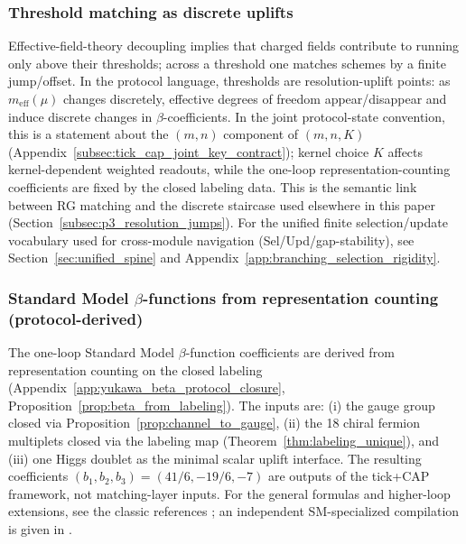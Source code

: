 \subsubsection{Threshold matching as discrete uplifts}
\label{subsec:threshold_matching}

\InterfaceTag Effective-field-theory decoupling implies that charged fields contribute to running only above their thresholds; across a threshold one matches schemes by a finite jump/offset.
In the protocol language, thresholds are resolution-uplift points: as $m_{\mathrm{eff}}(\mu)$ changes discretely, effective degrees of freedom appear/disappear and induce discrete changes in $\beta$-coefficients.
In the joint protocol-state convention, this is a statement about the $(m,n)$ component of $(m,n,K)$ (Appendix~\ref{subsec:tick_cap_joint_key_contract}); kernel choice $K$ affects kernel-dependent weighted readouts, while the one-loop representation-counting coefficients are fixed by the closed labeling data.
This is the semantic link between RG matching and the discrete staircase used elsewhere in this paper (Section~\ref{subsec:p3_resolution_jumps}).
\AuditTag For the unified finite selection/update vocabulary used for cross-module navigation (Sel/Upd/gap-stability), see Section~\ref{sec:unified_spine} and Appendix~\ref{app:branching_selection_rigidity}.

\subsubsection{Standard Model $\beta$-functions from representation counting (protocol-derived)}
\label{subsec:sm_beta_functions_dictionary}

\InterfaceTag The one-loop Standard Model $\beta$-function coefficients are derived from representation counting on the closed labeling (Appendix~\ref{app:yukawa_beta_protocol_closure}, Proposition~\ref{prop:beta_from_labeling}).
The inputs are: (i) the gauge group closed via Proposition~\ref{prop:channel_to_gauge}, (ii) the 18 chiral fermion multiplets closed via the labeling map (Theorem~\ref{thm:labeling_unique}), and (iii) one Higgs doublet as the minimal scalar uplift interface.
The resulting coefficients $(b_1,b_2,b_3)=(41/6,-19/6,-7)$ are outputs of the tick+CAP framework, not matching-layer inputs.
For the general formulas and higher-loop extensions, see the classic references \cite{MachacekVaughn1983,MachacekVaughn1984,MachacekVaughn1985}; an independent SM-specialized compilation is given in \cite{LuoXiao2003}.

